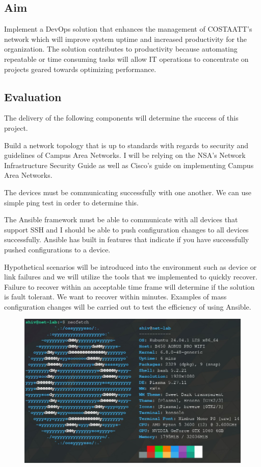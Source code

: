 \documentclass[12pt, letterpaper]{article}
\begin{document}
	\subsection{Aim}
Implement a DevOps solution that enhances the management of COSTAATT's network which will improve system uptime and increased productivity for the organization. The solution contributes to productivity because automating repeatable or time consuming tasks will allow IT operations to concentrate on projects geared towards optimizing performance.

\newpage

	\subsection{Evaluation}
The delivery of the following components will determine the success of this project.

\medskip

Build a network topology that is up to standards with regards to security and guidelines of Campus Area Networks. I will be relying on the NSA’s Network Infrastructure Security Guide as well as Cisco’s guide on implementing Campus Area Networks. 

\medskip

The devices must be communicating successfully with one another. We can use simple ping test in order to determine this. 

\medskip

The Ansible framework must be able to communicate with all devices that support SSH and I should be able to push configuration changes to all devices successfully. Ansible has built in features that indicate if you have successfully pushed configurations to a device. 

\medskip

Hypothetical scenarios will be introduced into the environment such as device or link failures and we will utilize the tools that we implemented to quickly recover. Failure to recover within an acceptable time frame will determine if the solution is fault tolerant. We want to recover within minutes. Examples of mass configuration changes will be carried out to test the efficiency of using Ansible. 

\newpage

\begin{figure}
\includegraphics[scale=0.65]{neofetch_Output.jpg}
\end{figure}
\end{document}
